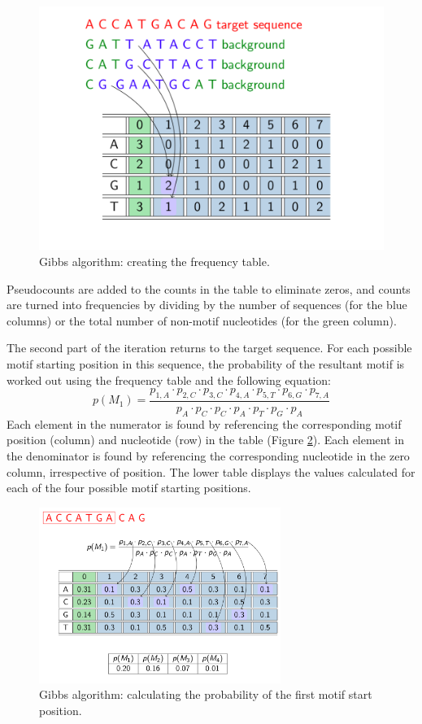 \documentclass[12pt]{article}
\begin{document}
\begin{figure}[htbp]
\centering
\includegraphics[width=0.7\linewidth]{GibbsTable.png}
\caption{Gibbs algorithm: creating the frequency table.}\label{gibbs1}
\end{figure}

Pseudocounts are added to the counts in the table to eliminate zeros, and counts are turned into frequencies by dividing by the number of sequences (for the blue columns) or the total number of non-motif nucleotides (for the green column).

The second part of the iteration returns to the target sequence. For each possible motif starting position in this sequence, the probability of the resultant motif is worked out using the frequency table and the following equation: 
\begin{equation}
p(M_{1}) = \frac{p_{1,A} \cdot p_{2,C} \cdot p_{3,C} \cdot p_{4,A} \cdot p_{5,T} \cdot p_{6,G} \cdot p_{7,A}}{p_{A} \cdot p_{C} \cdot p_{C} \cdot p_{A} \cdot p_{T} \cdot p_{G} \cdot p_{A}}
\end{equation}
Each element in the numerator is found by referencing the corresponding motif position (column) and nucleotide (row) in the table (Figure \ref{gibbs2}). Each element in the denominator is found by referencing the corresponding nucleotide in the zero column, irrespective of position. The lower table displays the values calculated for each of the four possible motif starting positions.  

\begin{figure}[!htbp]
\centering
\includegraphics[width=0.7\textwidth]{GibbsTable1.png}
\caption{Gibbs algorithm: calculating the probability of the first motif start position.}\label{gibbs2}
\end{figure}
\end{document}
